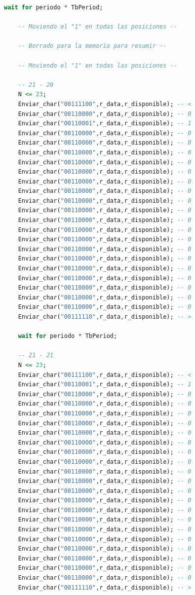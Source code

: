 \begin{lstlisting}[language = vhdl,caption=Testbench del módulo UART,label={lst:test_uart}]
	wait for periodo * TbPeriod;
	
	-- Moviendo el "1" en todas las posiciones --

	-- Borrado para la memoria para resumir --
	
	-- Moviendo el "1" en todas las posiciones --
	
	-- 21 - 20
	N <= 23; 	
	Enviar_char("00111100",r_data,r_disponible); -- < 	
	Enviar_char("00110000",r_data,r_disponible); -- 0 	
	Enviar_char("00110001",r_data,r_disponible); -- 1
 	Enviar_char("00110000",r_data,r_disponible); -- 0 	
	Enviar_char("00110000",r_data,r_disponible); -- 0
	Enviar_char("00110000",r_data,r_disponible); -- 0 	
	Enviar_char("00110000",r_data,r_disponible); -- 0
	Enviar_char("00110000",r_data,r_disponible); -- 0 	
	Enviar_char("00110000",r_data,r_disponible); -- 0
	Enviar_char("00110000",r_data,r_disponible); -- 0 	
	Enviar_char("00110000",r_data,r_disponible); -- 0
	Enviar_char("00110000",r_data,r_disponible); -- 0 	
	Enviar_char("00110000",r_data,r_disponible); -- 0
	Enviar_char("00110000",r_data,r_disponible); -- 0 	
	Enviar_char("00110000",r_data,r_disponible); -- 0
	Enviar_char("00110000",r_data,r_disponible); -- 0 	
	Enviar_char("00110000",r_data,r_disponible); -- 0
	Enviar_char("00110000",r_data,r_disponible); -- 0 	
	Enviar_char("00110000",r_data,r_disponible); -- 0
	Enviar_char("00110000",r_data,r_disponible); -- 0 	
	Enviar_char("00110000",r_data,r_disponible); -- 0
	Enviar_char("00110000",r_data,r_disponible); -- 0 	
	Enviar_char("00111110",r_data,r_disponible); -- >

	wait for periodo * TbPeriod;

	-- 21 - 21
	N <= 23; 	
	Enviar_char("00111100",r_data,r_disponible); -- < 	
	Enviar_char("00110001",r_data,r_disponible); -- 1 	
	Enviar_char("00110000",r_data,r_disponible); -- 0
 	Enviar_char("00110000",r_data,r_disponible); -- 0 	
	Enviar_char("00110000",r_data,r_disponible); -- 0
	Enviar_char("00110000",r_data,r_disponible); -- 0 	
	Enviar_char("00110000",r_data,r_disponible); -- 0
	Enviar_char("00110000",r_data,r_disponible); -- 0 	
	Enviar_char("00110000",r_data,r_disponible); -- 0
	Enviar_char("00110000",r_data,r_disponible); -- 0 	
	Enviar_char("00110000",r_data,r_disponible); -- 0
	Enviar_char("00110000",r_data,r_disponible); -- 0 	
	Enviar_char("00110000",r_data,r_disponible); -- 0
	Enviar_char("00110000",r_data,r_disponible); -- 0 	
	Enviar_char("00110000",r_data,r_disponible); -- 0
	Enviar_char("00110000",r_data,r_disponible); -- 0 	
	Enviar_char("00110000",r_data,r_disponible); -- 0
	Enviar_char("00110000",r_data,r_disponible); -- 0 	
	Enviar_char("00110000",r_data,r_disponible); -- 0
	Enviar_char("00110000",r_data,r_disponible); -- 0 	
	Enviar_char("00110000",r_data,r_disponible); -- 0
	Enviar_char("00110000",r_data,r_disponible); -- 0 	
	Enviar_char("00111110",r_data,r_disponible); -- >


\end{lstlisting}
